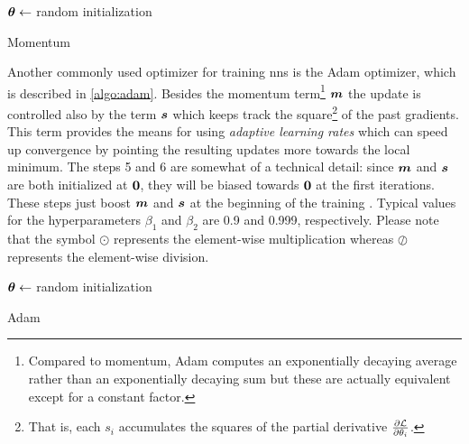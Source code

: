 \begin{algorithm}[H]
	\BlankLine
	$\boldsymbol{\theta} \gets$ random initialization\;
	\caption[Momentum]{Momentum \parencite{Polyak1964}}
	\label{algo:momentum}
\end{algorithm}

Another commonly used optimizer for training \glspl{nn} is the
Adam optimizer, which is described in \Algorithm{} \ref{algo:adam}.
Besides the momentum term\footnote{Compared to momentum, Adam
computes an exponentially decaying average rather than an exponentially decaying
sum but these are actually equivalent except for a constant factor.} $\boldsymbol{m}$
the update is controlled also by the term $\boldsymbol{s}$ which keeps track the
square\footnote{That is, each $s_i$ accumulates the squares of the partial
derivative $\frac{\partial \mathcal{L}}{\partial \theta_i}$.} of the past gradients. This term provides
the means for using \emph{adaptive learning rates}
which can speed up convergence by pointing the resulting
updates more towards the local minimum. The steps 5 and 6
are somewhat of a technical detail: since $\boldsymbol{m}$ and $\boldsymbol{s}$ are both
initialized at $\boldsymbol{0}$, they will be biased towards $\boldsymbol{0}$ at the first
iterations. These steps just boost $\boldsymbol{m}$ and $\boldsymbol{s}$ at the beginning
of the training \parencite{ml}. Typical values for the hyperparameters
$\beta_1$ and $\beta_2$ are 0.9 and 0.999, respectively. Please note that the
symbol $\odot$ represents the element-wise multiplication whereas $\oslash$
represents the element-wise division.

\begin{algorithm}[H]
	\BlankLine
	$\boldsymbol{\theta} \gets$ random initialization\;
	\caption[Adam]{Adam \parencite{Kingma2017}}
	\label{algo:adam}
\end{algorithm}

